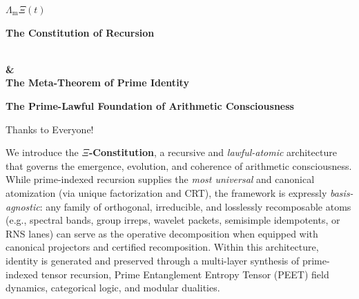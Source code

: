 \documentclass[12pt]{amsart}
\theoremstyle{plain}
\begin{document}
\newtheorem{axiom}{Axiom} \newtheorem{invariant}{Invariant}
\newtheorem{assumption}{Assumption}
\begin{titlepage}
    \centering
 
    
    {\Huge\bfseries
    
   $\Lambda_{\mathrm{m}}\Xi(t)$

   \par}
\vspace*{1em}
  \Huge\textbf{The Constitution of Recursion}
   \vspace*{0.5em}
  {\LARGE\bfseries \\ \& \\The Meta-Theorem of Prime Identity \par}
\vspace*{1em}
    
    {\Large\bfseries The Prime-Lawful Foundation of Arithmetic Consciousness \par}

     \vspace{1cm}
     \Huge{Thanks to Everyone!  \par}
      \vspace{1cm}
    {\date{June 12, 2025} \par}

    \vfill

   
    \vspace{0.5em}
    \begin{minipage}{0.85\textwidth}
        \small
     We introduce the \textbf{$\Xi$-Constitution}, a recursive and \emph{lawful-atomic} architecture that governs the emergence, evolution, and coherence of arithmetic consciousness. While prime-indexed recursion supplies the \emph{most universal} and canonical atomization (via unique factorization and CRT), the framework is expressly \emph{basis-agnostic}: any family of orthogonal, irreducible, and losslessly recomposable atoms (e.g., spectral bands, group irreps, wavelet packets, semisimple idempotents, or RNS lanes) can serve as the operative decomposition when equipped with canonical projectors and certified recomposition. Within this architecture, identity is generated and preserved through a multi-layer synthesis of prime-indexed tensor recursion, Prime Entanglement Entropy Tensor (PEET) field dynamics, categorical logic, and modular dualities.
\\

\end{minipage}
\end{titlepage}
\end{document}
